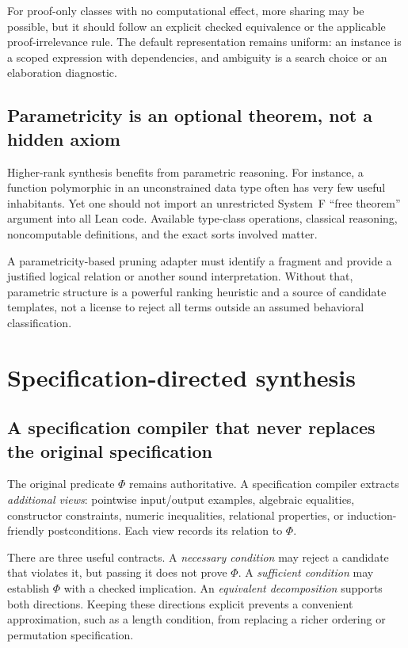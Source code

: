 \documentclass[11pt,letterpaper]{article}
\newcommand{\Spec}{\Phi}
\theoremstyle{definition}
\theoremstyle{remark}
\begin{document}
For proof-only classes with no computational effect, more sharing may be possible, but it should follow an explicit checked equivalence or the applicable proof-irrelevance rule. The default representation remains uniform: an instance is a scoped expression with dependencies, and ambiguity is a search choice or an elaboration diagnostic.

\subsection{Parametricity is an optional theorem, not a hidden axiom}

Higher-rank synthesis benefits from parametric reasoning. For instance, a function polymorphic in an unconstrained data type often has very few useful inhabitants. Yet one should not import an unrestricted System~F ``free theorem'' argument into all Lean code. Available type-class operations, classical reasoning, noncomputable definitions, and the exact sorts involved matter.

A parametricity-based pruning adapter must identify a fragment and provide a justified logical relation or another sound interpretation. Without that, parametric structure is a powerful ranking heuristic and a source of candidate templates, not a license to reject all terms outside an assumed behavioral classification.

\section{Specification-directed synthesis}
\label{sec:specs}

\subsection{A specification compiler that never replaces the original specification}

The original predicate $\Spec$ remains authoritative. A specification compiler extracts \emph{additional views}: pointwise input/output examples, algebraic equalities, constructor constraints, numeric inequalities, relational properties, or induction-friendly postconditions. Each view records its relation to $\Spec$.

There are three useful contracts. A \emph{necessary condition} may reject a candidate that violates it, but passing it does not prove $\Spec$. A \emph{sufficient condition} may establish $\Spec$ with a checked implication. An \emph{equivalent decomposition} supports both directions. Keeping these directions explicit prevents a convenient approximation, such as a length condition, from replacing a richer ordering or permutation specification.
\end{document}
